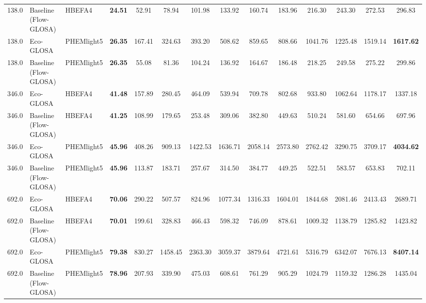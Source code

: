 \begin{table}[htb]
{\begin{tabular}{l l l *{11}{c}}
      138.0 & Baseline (Flow-GLOSA)      & HBEFA4       & \textbf{24.51}      & 52.91 & 78.94      & 101.98     & 133.92     & 160.74     & 183.96     & 216.30     & 243.30     & 272.53     & 296.83     \\
      138.0 & Eco-GLOSA                  & PHEMlight5   & \textbf{26.35}      & 167.41     & 324.63     & 393.20     & 508.62     & 859.65     & 808.66     & 1041.76    & 1225.48    & 1519.14    & \textbf{1617.62} \\
      138.0 & Baseline (Flow-GLOSA)      & PHEMlight5   & \textbf{26.35}      & 55.08      & 81.36      & 104.24     & 136.92     & 164.67     & 186.48     & 218.25     & 249.58     & 275.22     & 299.86     \\
      \midrule
      346.0 & Eco-GLOSA                  & HBEFA4       & \textbf{41.48}      & 157.89     & 280.45     & 464.09     & 539.94     & 709.78     & 802.68     & 933.80     & 1062.64    & 1178.17    & 1337.18    \\
      346.0 & Baseline (Flow-GLOSA)      & HBEFA4       & \textbf{41.25}      & 108.99 & 179.65     & 253.48     & 309.06     & 382.80     & 449.63     & 510.24     & 581.60     & 654.66     & 697.96     \\
      346.0 & Eco-GLOSA                  & PHEMlight5   & \textbf{45.96}      & 408.26     & 909.13     & 1422.53    & 1636.71    & 2058.14    & 2573.80    & 2762.42    & 3290.75    & 3709.17    & \textbf{4034.62} \\
      346.0 & Baseline (Flow-GLOSA)      & PHEMlight5   & \textbf{45.96}      & 113.87     & 183.71     & 257.67     & 314.50     & 384.77     & 449.25     & 522.51     & 583.57     & 653.83     & 702.11     \\
      \midrule
      692.0 & Eco-GLOSA                  & HBEFA4       & \textbf{70.06}      & 290.22     & 507.57     & 824.96     & 1077.34    & 1316.33    & 1604.01    & 1844.68    & 2081.46    & 2413.43    & 2689.71    \\
      692.0 & Baseline (Flow-GLOSA)      & HBEFA4       & \textbf{70.01}      & 199.61 & 328.83     & 466.43     & 598.32     & 746.09     & 878.61     & 1009.32    & 1138.79    & 1285.82    & 1423.82    \\
      692.0 & Eco-GLOSA                  & PHEMlight5   & \textbf{79.38}      & 830.27     & 1458.45    & 2363.30    & 3059.37    & 3879.64    & 4721.61    & 5316.79    & 6342.07    & 7676.13    & \textbf{8407.14} \\
      692.0 & Baseline (Flow-GLOSA)      & PHEMlight5   & \textbf{78.96}      & 207.93     & 339.90     & 475.03     & 608.61     & 761.29     & 905.29     & 1024.79    & 1159.32    & 1286.28    & 1435.04    \\

\end{tabular}}
\end{table}

